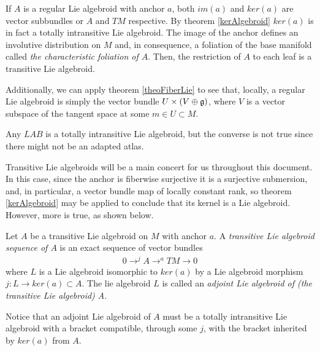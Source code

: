 \begin{remark}
If $A$ is a regular Lie algebroid with anchor $a$, both $im(a)$ and $ker(a)$ are vector subbundles or $A$ and $TM$ respective. By theorem \ref{kerAlgebroid} $ker(a)$ is in fact a totally intransitive Lie algebroid. The image of the anchor defines an involutive distribution  on $M$ and, in consequence, a foliation of the base manifold called \emph{the characteristic foliation of $A$}. Then, the restriction of $A$ to each leaf is a transitive Lie algebroid. 

Additionally, we can apply theorem \ref{theoFiberLie} to see that, locally, a regular Lie algebroid is simply the vector bundle $U \times (V \oplus \mathfrak{g})$, where $V$ is a vector subspace of the tangent space at some $m \in U \subset M$.
\end{remark}

\begin{remark}
Any $LAB$ is a totally intransitive Lie algebroid, but the converse is not true since there might not be an adapted atlas.
\end{remark}

Transitive Lie algebroids will be a main concert for us throughout this document. In this case, since the anchor is fiberwise surjective it is a surjective submersion, and, in particular, a vector bundle map of locally constant rank, so theorem \ref{kerAlgebroid} may be applied to conclude that its kernel is a Lie algebroid. However, more is true, as shown below.

\begin{definition}\label{transitiveSequence}
Let $A$ be a transitive Lie algebroid on $M$ with anchor $a$. A \emph{transitive Lie algebroid sequence of $A$} is an exact sequence of vector bundles
\begin{align}
    0 \to^j A \to^a TM \to 0
\end{align}
where $L$ is a Lie algebroid isomorphic to $ker(a)$ by a Lie algebroid morphism $j:L \to ker(a) \subset A$. The lie algebroid $L$ is called an \emph{adjoint Lie algebroid of (the transitive Lie algebroid) A}.
\end{definition}
Notice that an adjoint Lie algebroid of $A$ must be a totally intransitive Lie algebroid with a bracket compatible, through some $j$, with the bracket inherited by $ker(a)$ from $A$.

